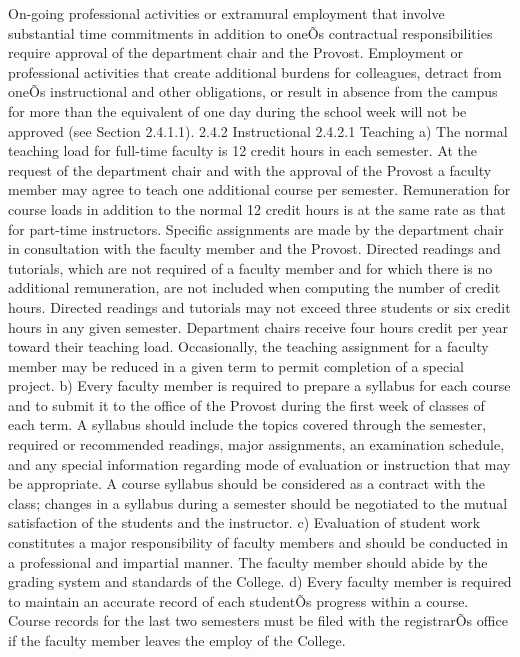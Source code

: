 \documentclass[letterpaper, 11pt]{article}
\begin{document}
	On-going professional activities or extramural employment that involve substantial time commitments in addition to oneÕs contractual responsibilities require approval of the department chair and the Provost.  Employment or professional activities that create additional burdens for colleagues, detract from oneÕs instructional and other obligations, or result in absence from the campus for more than the equivalent of one day during the school week will not be approved (see Section 2.4.1.1).
	2.4.2 Instructional
	2.4.2.1 Teaching
	a) The normal teaching load for full-time faculty is 12 credit hours in each semester.  At the request of the department chair and with the approval of the Provost a faculty member may agree to teach one additional course per semester.  Remuneration for course loads in addition to the normal 12 credit hours is at the same rate as that for part-time instructors.  Specific assignments are made by the department chair in consultation with the faculty member and the Provost.  Directed readings and tutorials, which are not required of a faculty member and for which there is no additional remuneration, are not included when computing the number of credit hours.  Directed readings and tutorials may not exceed three students or six credit hours in any given semester.  Department chairs receive four hours credit per year toward their teaching load.  Occasionally, the teaching assignment for a faculty member may be reduced in a given term to permit completion of a special project.
	b) Every faculty member is required to prepare a syllabus for each course and to submit it to the office of the Provost during the first week of classes of each term.  A syllabus should include the topics covered through the semester, required or recommended readings, major assignments, an examination schedule, and any special information regarding mode of evaluation or instruction that may be appropriate.  A course syllabus should be considered as a contract with the class; changes in a syllabus during a semester should be negotiated to the mutual satisfaction of the students and the instructor.
	c) Evaluation of student work constitutes a major responsibility of faculty members and should be conducted in a professional and impartial manner.  The faculty member should abide by the grading system and standards of the College.
	d) Every faculty member is required to maintain an accurate record of each studentÕs progress within a course.  Course records for the last two semesters must be filed with the registrarÕs office if the faculty member leaves the employ of the College.
\end{document}

